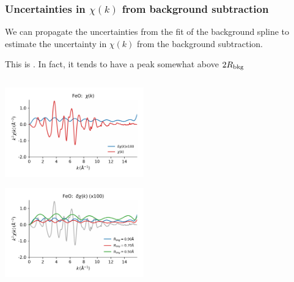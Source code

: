 \begin{frame}\frametitle{ Uncertainties in $\chi(k)$ from background subtraction}


\vmm
\begin{cenpage}{105mm}

  We can propagate the uncertainties from the fit of the background spline
  to estimate the uncertainty in $\chi(k)$ from the background subtraction.

  \vmm \vmm

  This is {}.   In fact, it tends to have a peak
  somewhat above $2 R_{\rm bkg}$
\end{cenpage}

\begin{columns}
  \begin{column}[T]{60mm}

    { { \includegraphics[width=60mm]{figs/errors/feo_chik_deltachi}}}

    { { \includegraphics[width=60mm]{figs/errors/feo_deltachik_rbkg} }}

    \end{column}

    \begin{column}[T]{60mm}

      {}


\end{column}
\end{columns}
\end{frame}
